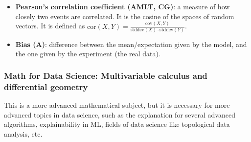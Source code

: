 \documentclass{article}
\begin{document}
\begin{itemize}
	\item \textbf{Pearson's correlation coefficient (AMLT, CG)}: a measure of how closely two events are correlated. It is the cosine of the spaces of random vectors. It is defined as $\text{cor}(X, Y) = \frac{\text{cov}(X, Y)}{\text{stddev}(X) \cdot \text{stddev}(Y)}$.

	\item \textbf{Bias (A)}: difference between the mean/expectation given by the model, and the one given by the experiment (the real data).

\end{itemize}



\subsubsection*{Math for Data Science: Multivariable calculus and differential geometry}

This is a more advanced mathematical subject, but it is necessary for more advanced topics in data science, such as the explanation for several advanced algorithms, explainability in ML, fields of data science like topological data analysis, etc.
\end{document}
